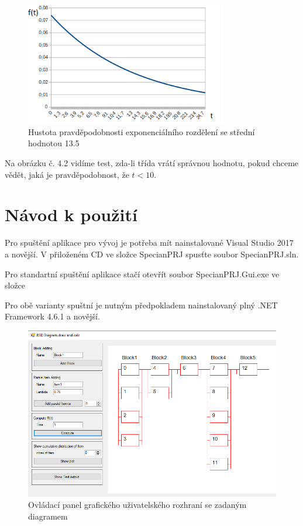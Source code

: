 \documentclass[FM,RP]{tulthesis}
\begin{document}
        \begin{figure}
            \begin{center}
                \includegraphics[width=250pt]{pic/testHustota.png}
                \caption{Hustota pravděpodobnosti exponenciálního rozdělení se střední hodnotou 13.5}
            \end{center}
        \end{figure}

            Na obrázku č. 4.2 vidíme test, zda-li třída vrátí správnou hodnotu, pokud chceme vědět, jaká je pravděpodobnost, že $ t < 10 $.


\chapter{Návod k použití}

    Pro spuštění aplikace pro vývoj je potřeba mít nainstalované Visual Studio 2017 a novější. 
    V přiloženém CD ve složce SpecianPRJ spusťte soubor SpecianPRJ.sln. 

    Pro standartní spuštění aplikace stačí otevřít soubor SpecianPRJ.Gui.exe ve složce 

    Pro obě varianty spuštní je nutným předpokladem nainstalovaný plný .NET Framework 4.6.1 a novější. 
    \begin{figure}[h]
        \centering
        \includegraphics[scale=0.70]{pic/gui.png}
        \caption{Ovládací panel grafického uživatelského rozhraní se zadaným diagramem} 
    \end{figure}
\end{document}
